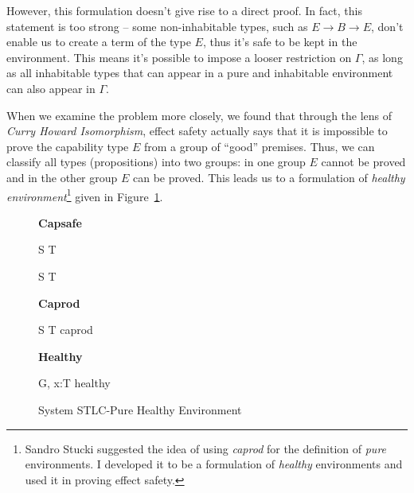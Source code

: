 However, this formulation doesn't give rise to a direct proof. In
fact, this statement is too strong -- some non-inhabitable types, such
as $E \to B \to E$, don't enable us to create a term of the type $E$,
thus it's safe to be kept in the environment. This means it's possible
to impose a looser restriction on $\Gamma$, as long as all inhabitable
types that can appear in a pure and inhabitable environment can also
appear in $\Gamma$.

When we examine the problem more closely, we found that through the
lens of \emph{Curry Howard Isomorphism}, effect safety actually says
that it is impossible to prove the capability type $E$ from a group of
``good'' premises. Thus, we can classify all types (propositions) into
two groups: in one group $E$ cannot be proved and in the other group
$E$ can be proved. This leads us to a formulation of \emph{healthy
  environment}\footnote{Sandro Stucki suggested the idea of using
  \emph{caprod} for the definition of \emph{pure} environments. I
  developed it to be a formulation of \emph{healthy} environments and
  used it in proving effect safety.} given in
Figure~\ref{fig:stlc-pure-healthy-definition}.

\begin{figure}[h]
\begin{framed}

\setlength{\columnseprule}{0.4pt}
\begin{multicols}{2}

\textbf{Capsafe}


{ S \to T \quad {} }

{ S \to T \quad {} }

\columnbreak

\textbf{Caprod}


{ S \to T \quad caprod }

\textbf{Healthy}


{ G, \; x:T \quad healthy }


\end{multicols}
\end{framed}

\caption{System STLC-Pure Healthy Environment}
\label{fig:stlc-pure-healthy-definition}
\end{figure}

